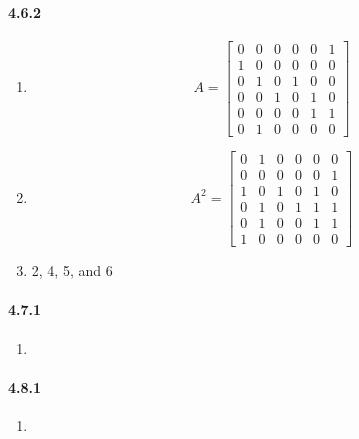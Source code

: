 \documentclass[11pt, letterpaper, twocolumn, fleqn]{article}
\begin{document}
    \paragraph{4.6.2}
        \begin{enumerate}
            \item 
                $$A =   \begin{bmatrix}
                        0 & 0 & 0 & 0 & 0 & 1\\
                        1 & 0 & 0 & 0 & 0 & 0\\
                        0 & 1 & 0 & 1 & 0 & 0\\
                        0 & 0 & 1 & 0 & 1 & 0\\
                        0 & 0 & 0 & 0 & 1 & 1\\
                        0 & 1 & 0 & 0 & 0 & 0
                        \end{bmatrix}$$
            \item
                $$A^2 = \begin{bmatrix}
                        0 & 1 & 0 & 0 & 0 & 0\\
                        0 & 0 & 0 & 0 & 0 & 1\\
                        1 & 0 & 1 & 0 & 1 & 0\\
                        0 & 1 & 0 & 1 & 1 & 1\\
                        0 & 1 & 0 & 0 & 1 & 1\\
                        1 & 0 & 0 & 0 & 0 & 0
                        \end{bmatrix}$$
            \item 2, 4, 5, and 6
        \end{enumerate}
    
    \paragraph{4.7.1}
        \begin{enumerate}
            \item 
        \end{enumerate}
    
    \paragraph{4.8.1}
        \begin{enumerate}
            \item 
        \end{enumerate}
    
\end{document}
